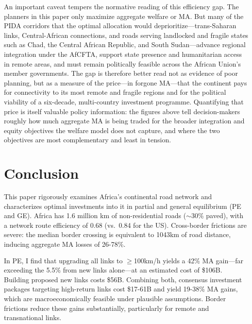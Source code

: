 \documentclass[a4paper]{article}
\begin{document}
An important caveat tempers the normative reading of this efficiency gap. The planners in this paper only maximize aggregate welfare or MA. But many of the PIDA corridors that the optimal allocation would deprioritize---trans-Saharan links, Central-African connections, and roads serving landlocked and fragile states such as Chad, the Central African Republic, and South Sudan---advance regional integration under the AfCFTA, support state presence and humanitarian access in remote areas, and must remain politically feasible across the African Union's member governments. %
The gap is therefore better read not as evidence of poor planning, but as a measure of the price---in forgone MA---that the continent pays for connectivity to its most remote and fragile regions and for the political viability of a six-decade, multi-country investment programme. Quantifying that price is itself valuable policy information: the figures above tell decision-makers roughly how much aggregate MA is being traded for the broader integration and equity objectives the welfare model does not capture, and where the two objectives are most complementary and least in tension. %




\section{Conclusion} %

This paper rigorously examines Africa's continental road network and characterizes optimal investments into it in partial and general equilibrium (PE and GE). Africa has 1.6 million km of non-residential roads ($\sim$30\% paved), with a network route efficiency of 0.68 (vs.\ 0.84 for the US). Cross-border frictions are severe: the median border crossing is equivalent to 1043km of road distance, inducing aggregate MA losses of 26-78\%. \newline 

In PE, I find that upgrading all links to $\geq$100km/h yields a 42\% MA gain---far exceeding the 5.5\% from new links alone---at an estimated cost of \$106B. Building proposed new links costs \$56B. Combining both, consensus investment packages targeting high-return links cost \$17-61B and yield 19-38\% MA gains, which are macroeconomically feasible under plausible assumptions. Border frictions reduce these gains substantially, particularly for remote and transnational links. \newline 
\end{document}
